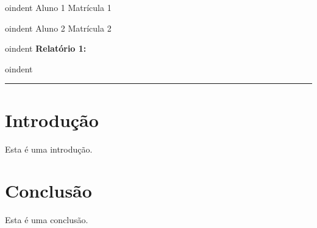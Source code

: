 \documentclass[11pt]{article}
\begin{document}

oindent Aluno 1 \hfill Matrícula 1


oindent Aluno 2 \hfill Matrícula 2


oindent \textbf{Relatório 1: }


oindent \rule{\linewidth}{1.5pt}

\section{Introdução}

Esta é uma introdução.

\section{Conclusão}

Esta é uma conclusão.
\end{document}
